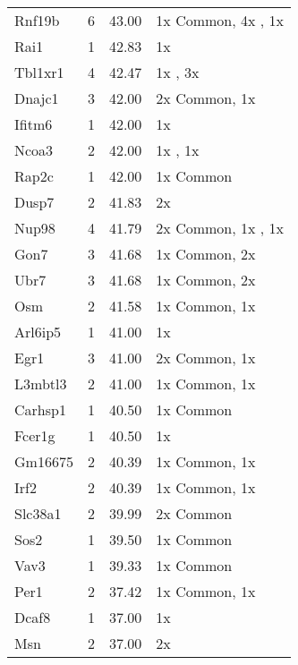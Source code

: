 {\begin{longtable}[l]{lccl}
Rnf19b	&  \num{6}	&  \num{ 43.00}	& 1x Common, 4x  \dnmtchipregular, 1x  \dnmtwtregular\\ 
Rai1	&  \num{1}	&  \num{ 42.83}	& 1x  \dnmtchipregular\\ 
Tbl1xr1	&  \num{4}	&  \num{ 42.47}	& 1x  \dnmtchipregular, 3x  \dnmtwtregular\\ 
Dnajc1	&  \num{3}	&  \num{ 42.00}	& 2x Common, 1x  \dnmtwtregular\\ 
Ifitm6	&  \num{1}	&  \num{ 42.00}	& 1x  \dnmtwtregular\\ 
Ncoa3	&  \num{2}	&  \num{ 42.00}	& 1x  \dnmtchipregular, 1x  \dnmtwtregular\\ 
Rap2c	&  \num{1}	&  \num{ 42.00}	& 1x Common\\ 
Dusp7	&  \num{2}	&  \num{ 41.83}	& 2x  \dnmtchipregular\\ 
Nup98	&  \num{4}	&  \num{ 41.79}	& 2x Common, 1x  \dnmtchipregular, 1x  \dnmtwtregular\\ 
Gon7	&  \num{3}	&  \num{ 41.68}	& 1x Common, 2x  \dnmtchipregular\\ 
Ubr7	&  \num{3}	&  \num{ 41.68}	& 1x Common, 2x  \dnmtchipregular\\ 
Osm	&  \num{2}	&  \num{ 41.58}	& 1x Common, 1x  \dnmtwtregular\\ 
Arl6ip5	&  \num{1}	&  \num{ 41.00}	& 1x  \dnmtwtregular\\ 
Egr1	&  \num{3}	&  \num{ 41.00}	& 2x Common, 1x  \dnmtchipregular\\ 
L3mbtl3	&  \num{2}	&  \num{ 41.00}	& 1x Common, 1x  \dnmtchipregular\\ 
Carhsp1	&  \num{1}	&  \num{ 40.50}	& 1x Common\\ 
Fcer1g	&  \num{1}	&  \num{ 40.50}	& 1x  \dnmtchipregular\\ 
Gm16675	&  \num{2}	&  \num{ 40.39}	& 1x Common, 1x  \dnmtwtregular\\ 
Irf2	&  \num{2}	&  \num{ 40.39}	& 1x Common, 1x  \dnmtwtregular\\ 
Slc38a1	&  \num{2}	&  \num{ 39.99}	& 2x Common\\ 
Sos2	&  \num{1}	&  \num{ 39.50}	& 1x Common\\ 
Vav3	&  \num{1}	&  \num{ 39.33}	& 1x Common\\ 
Per1	&  \num{2}	&  \num{ 37.42}	& 1x Common, 1x  \dnmtchipregular\\ 
Dcaf8	&  \num{1}	&  \num{ 37.00}	& 1x  \dnmtchipregular\\ 
Msn	&  \num{2}	&  \num{ 37.00}	& 2x  \dnmtchipregular\\ 

\end{longtable}}
